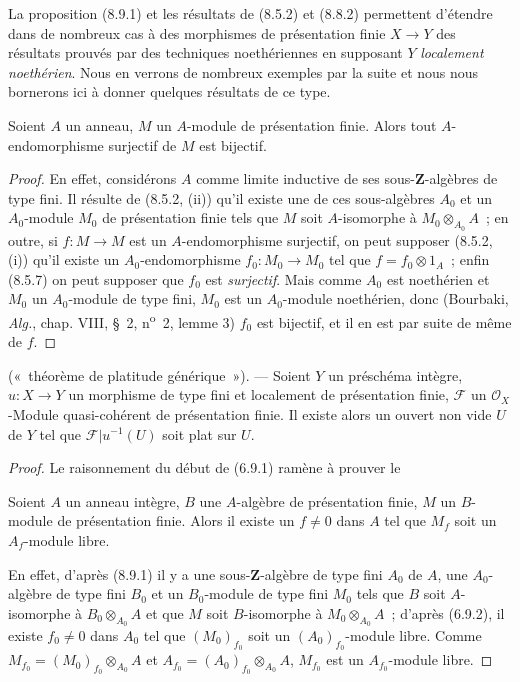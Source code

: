 \begin{env}[8.9.2]
\label{IV.8.9.2-fr}
La proposition (8.9.1) et les résultats de (8.5.2) et (8.8.2) permettent
d'étendre dans de nombreux cas à des morphismes de présentation finie
$X\to Y$ des résultats prouvés par des techniques noethériennes en supposant
$Y$ \emph{localement noethérien}.
Nous en verrons de nombreux exemples par la suite et nous nous bornerons ici
à donner quelques résultats de ce type.
\end{env}

\begin{proposition}[8.9.3]
\label{IV.8.9.3-fr}
Soient $A$ un anneau, $M$ un $A$-module de présentation finie. Alors tout
$A$-endomorphisme surjectif de $M$ est bijectif.
\end{proposition}

\begin{proof}
En effet, considérons $A$ comme limite inductive de ses sous-$\mathbf Z$-algèbres
de type fini. Il résulte de (8.5.2, (ii)) qu'il existe une de ces sous-algèbres
$A_0$ et un $A_0$-module $M_0$ de présentation finie tels que $M$ soit
$A$-isomorphe à $M_0\otimes_{A_0}A$~; en outre, si $f:M\to M$ est un
$A$-endomorphisme surjectif, on peut supposer (8.5.2, (i)) qu'il existe un
$A_0$-endomorphisme $f_0:M_0\to M_0$ tel que $f=f_0\otimes1_A$~; enfin
(8.5.7) on peut supposer que $f_0$ est \emph{surjectif}. Mais comme $A_0$ est
noethérien et $M_0$ un $A_0$-module de type fini, $M_0$ est un $A_0$-module
noethérien, donc (Bourbaki, \emph{Alg.}, chap. VIII, \S~2, n\textsuperscript{o}~2,
lemme 3) $f_0$ est bijectif, et il en est par suite de même de $f$.
\end{proof}

\begin{proposition}[8.9.4]
\label{IV.8.9.4-fr}
(«~théorème de platitude générique~»). --- Soient $Y$ un préschéma intègre,
$u:X\to Y$ un morphisme de type fini et localement de présentation finie,
$\mathcal F$ un $\mathcal O_X$-Module quasi-cohérent de présentation finie. Il
existe alors un ouvert non vide $U$ de $Y$ tel que
$\mathcal F|u^{-1}(U)$ soit plat sur $U$.
\end{proposition}

\begin{proof}
Le raisonnement du début de (6.9.1) ramène à prouver le

\begin{lemma}[8.9.4.1]
\label{IV.8.9.4.1-fr}
Soient $A$ un anneau intègre, $B$ une $A$-algèbre de présentation finie,
$M$ un $B$-module de présentation finie. Alors il existe un $f\neq0$ dans
$A$ tel que $M_f$ soit un $A_f$-module libre.
\end{lemma}

En effet, d'après (8.9.1) il y a une sous-$\mathbf Z$-algèbre de type fini
$A_0$ de $A$, une $A_0$-algèbre de type fini $B_0$ et un $B_0$-module de type
fini $M_0$ tels que $B$ soit $A$-isomorphe à $B_0\otimes_{A_0}A$ et que $M$
soit $B$-isomorphe à $M_0\otimes_{A_0}A$~; d'après (6.9.2), il existe
$f_0\neq0$ dans $A_0$ tel que $(M_0)_{f_0}$ soit un
$(A_0)_{f_0}$-module libre. Comme
$M_{f_0}=(M_0)_{f_0}\otimes_{A_0}A$ et
$A_{f_0}=(A_0)_{f_0}\otimes_{A_0}A$, $M_{f_0}$ est un $A_{f_0}$-module libre.
\end{proof}

